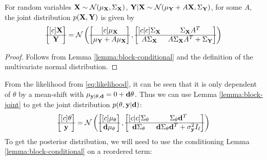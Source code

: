 \begin{lemma}
  \label{lemma:block-joint}
  For random variables $\mathbf{X} \sim \mathcal{N}(\mathbf{\mu}_{\mathbf{X}}, \Sigma_{\mathbf{X}})$, $\mathbf{Y}|\mathbf{X} \sim \mathcal{N}(\mathbf{\mu}_{\mathbf{Y}} + A\mathbf{X}, \Sigma_{\mathbf{Y}})$,
  for some $A$, the joint distribution $p(\mathbf{X}, \mathbf{Y})$ is given by
  \begin{equation}
    \begin{bmatrix}[c]
      \mathbf{X} \\
      \hline
      \mathbf{Y}
    \end{bmatrix}
    =
    \mathcal{N}\left(
      \begin{bmatrix}[c]
        \mathbf{\mu}_{\mathbf{X}} \\
        \hline
        \mathbf{\mu}_{\mathbf{Y}} + A\mathbf{\mu}_{\mathbf{X}}
      \end{bmatrix},
      \begin{bmatrix}[c | c]
        \Sigma_{\mathbf{X}} & \Sigma_{\mathbf{X}}A^T \\
        \hline
        A\Sigma_{\mathbf{X}} & A\Sigma_{\mathbf{X}}A^T + \Sigma_{\mathbf{Y}}
      \end{bmatrix}
    \right)
  \end{equation}
\end{lemma}
\begin{proof}
  Follows from Lemma \ref{lemma:block-conditional} and the definition of the multivariate normal distribution.
\end{proof}
From the likelihood from \eqref{eq:likelihood}, it can be seen that it is only dependent of $\theta$ by a mean-shift with $\mu_{\mathbf{y} | \theta, \mathbf{d}} = 0 + \mathbf{d}\theta$.
Thus we can use Lemma \ref{lemma:block-joint} to get the joint distribution $p(\theta, \mathbf{y} | \mathbf{d})$:
\begin{equation}
  \begin{bmatrix}[c]
    \theta \\
    \hline
    \mathbf{y}
  \end{bmatrix}
  =
  \mathcal{N}\left(
    \begin{bmatrix}[c]
      \mu_\theta \\
      \hline
      \mathbf{d}\mu_\theta
    \end{bmatrix},
    \begin{bmatrix}[c | c]
      \Sigma_{\mathbf{\theta}} & \Sigma_{\mathbf{\theta}}\mathbf{d}^T \\
      \hline
      \mathbf{d}\Sigma_{\mathbf{\theta}} & \mathbf{d}\Sigma_{\mathbf{\theta}}\mathbf{d}^T + \sigma^2_{\mathbf{y}} I_\ell
    \end{bmatrix}
  \right)
\end{equation}
To get the posterior distribution, we will need to use the conditioning Lemma \ref{lemma:block-conditional} on a reordered term:
